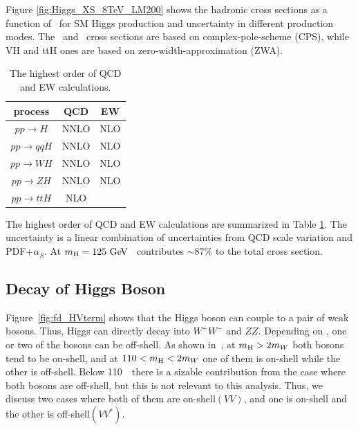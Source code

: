 Figure \ref{fig:Higgs_XS_8TeV_LM200} shows the hadronic cross sections 
as a function of \mHi\ for SM Higgs production and uncertainty 
in different production modes. The \ggH\ and \qqH\ cross sections 
are based on complex-pole-scheme (CPS), while VH and ttH ones 
are based on zero-width-approximation (ZWA). 
\begin{table}[htb]
\centering
\begin{tabular}{c c c  }
\hline
process     & QCD   & EW \\
\hline \hline 
$ pp \rightarrow H$         & NNLO  & NLO \\
$ pp \rightarrow qqH$       & NNLO  & NLO \\
$ pp \rightarrow WH$        & NNLO  & NLO \\
$ pp \rightarrow ZH$        & NNLO  & NLO \\
$ pp \rightarrow ttH$       & NLO   &     \\
\hline 
\end{tabular}
\label{tab:Higgs_XS_8TeV_order}
\caption{The highest order of QCD and EW calculations.}
\end{table}
The highest order of QCD and EW calculations are summarized in Table 
\ref{tab:Higgs_XS_8TeV_order}. The uncertainty is a linear combination 
of uncertainties from QCD scale variation and PDF+$\alpha_S$.
At $m_{\mathrm{H}}=125~\mathrm{Ge\kern -0.1em V}$ \ggH\ contributes $\sim 87 \%$ to the total cross section.



\newpage
\subsection{Decay of Higgs Boson}
\label{sec:decayHiggs}

Figure~\ref{fig:fd_HVterm} shows that the Higgs boson can 
couple to a pair of weak bosons. Thus, Higgs can directly decay into $W^+W^-$ and $ZZ$.
Depending on \mHi, one or two of the bosons can be off-shell. 
As shown in~\cite{Djouadi20081}, at $m_{\mathrm{H}}>2m_W$ both bosons 
tend to be on-shell, and at $110<m_{\mathrm{H}}<2m_W$ one of them is on-shell 
while the other is off-shell. Below 110~\GeV\ there is a sizable contribution 
from the case where both bosons are off-shell, but this is not relevant 
to this analysis. Thus, we discuss two cases where both of them are on-shell$(VV)$, 
and one is on-shell and the other is off-shell$(VV^*)$. 


